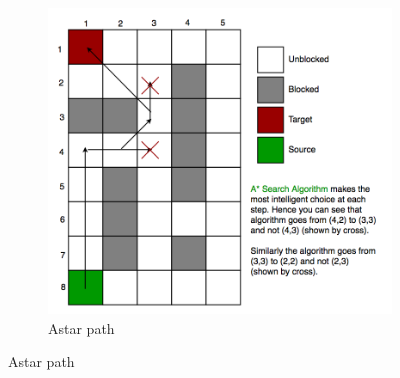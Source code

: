\documentclass[bibliography=totoc]{scrartcl}
\begin{document}
\begin{figure}[H]
	\centering
	\begin{subfigure}[b]{0.3\linewidth}
		\includegraphics[width=\linewidth]{img/a_-search-algorithm.png}
        \caption{Astar path}
        \label{fig:astar_path}
        	

\end{subfigure}
\end{figure}
\end{document}
